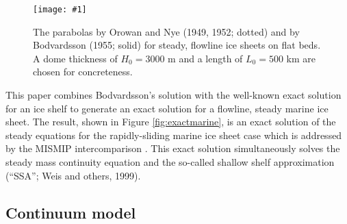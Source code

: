 \documentclass[twocolumn,letterpaper]{igs}
\newcommand{\onecol}[1]{\texttt{[image: \#1]}}
\begin{document}
\begin{figure}[ht]
\onecol{twoparabolas}
\caption{The parabolas by Orowan and Nye (1949, 1952; dotted) and by Bodvardsson (1955; solid) for steady, flowline ice sheets on flat beds.  A dome thickness of $H_0=3000$ m and a length of $L_0=500$ km are chosen for concreteness.} \label{fig:twoparabolas}
\end{figure}

This paper combines Bodvardsson's solution with the well-known exact solution for an ice shelf \citep{vanderVeen83,vanderVeen} to generate an exact solution for a flowline, steady marine ice sheet.  The result, shown in Figure \ref{fig:exactmarine}, is an exact solution of the steady equations for the rapidly-sliding marine ice sheet case \citep{SchoofMarine1} which is addressed by the MISMIP intercomparison \citep{MISMIP2012}.  This exact solution simultaneously solves the steady mass continuity equation and the so-called shallow shelf approximation (``SSA''; Weis and others, 1999).\nocite{WeisGreveHutter}


\subsection*{Continuum model}
\end{document}
